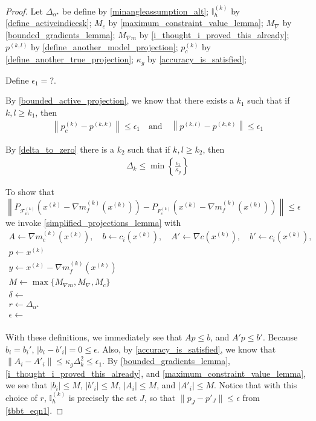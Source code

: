 \documentclass{article}
\theoremstyle{case}
\numberwithin{theorem}{subsection}
\newcommand{\dk}{\Delta_k}
\newcommand{\feasiblek}{{\mathcal F_m^{(k)}}}
\newcommand{\gk}{{\nabla m_f^{(k)}\left(\xk\right)}}
\newcommand{\maxgrad}{{M_{\nabla}}}
\newcommand{\minangledelta}{{\Delta_{\alpha^{\star}}}}
\newcommand{\xk}{x^{(k)}}
\newcommand{\projkl}{{p^{(k,l)}}}
\newcommand{\projkk}{{p^{(k,k)}}}
\newcommand{\trueprojk}{{p_c^{(k)}}}
\newcommand{\truefeasiblek}{{F_c^{(k)}}}
\newcommand{\maxmodelgrad}{{M_{\nabla m}}}
\newcommand{\activeindicesk}{{ \mathbb I_h^{(k)} }}
\newcommand{\modeljack}{{ \nabla m^{(k)}_{c}\left(\xk\right) }}
\newcommand{\truejack}{{ \nabla c\left(\xk\right) }}
\begin{document}
\begin{proof}
Let 
$\minangledelta$ be define by \cref{minangleassumption_alt};
$\activeindicesk$ by \cref{define_activeindicesk};
$M_c$ by \cref{maximum_constraint_value_lemma};
$\maxgrad$ by \cref{bounded_gradients_lemma};
$\maxmodelgrad$ by \cref{i_thought_i_proved_this_already};
$\projkl$ by \cref{define_another_model_projection};
$\trueprojk$ by \cref{define_another_true_projection};
$\kappa_g$ by \cref{accuracy_is_satisfied};

Define $\epsilon_1 = ?$.






By \cref{bounded_active_projection}, we know that there exists a $k_1$ such that if $k, l \ge k_1$, then
\begin{align}
\label{tbbt_eqn1}
\left\| \trueprojk - \projkk \right\| \le \epsilon_1 \quad \textrm{and} \quad
\left\| \projkl - \projkk \right\| \le \epsilon_1
\end{align}


By \cref{delta_to_zero} there is a $k_2$ such that if $k, l \ge k_2$, then
\begin{align*}
\dk \le \min\left\{\frac{\epsilon_1}{\kappa_g} \right\}
\end{align*}



To show that
$\left\| P_{\feasiblek}\left(\xk - \gk\right) - P_{\truefeasiblek}\left(\xk - \gk\right) \right\| \le \epsilon$
we invoke \cref{simplified_projections_lemma} with 
\begin{align*}
A			\gets \modeljack, \quad
b			\gets c_i\left(\xk\right), \quad
A'			\gets \truejack, \quad
b'			\gets c_i\left(\xk\right), \\
p			\gets \xk \\
y			\gets \xk - \gk \\
M			\gets \max\{\maxmodelgrad, \maxgrad, M_c\}\\
\delta		\gets \\
r			\gets \minangledelta \\
\epsilon	\gets \\
\end{align*}

With these definitions, we immediately see that $Ap \le b$, and $A'p \le b'$.
Because $b_i = b_i'$, $|b_i - b'_i| = 0 \le \epsilon$.
Also, by \cref{accuracy_is_satisfied}, we know that $\left\|A_i - A'_i \right\| \le \kappa_g \dk^2 \le \epsilon_1$.
By \cref{bounded_gradients_lemma}, \cref{i_thought_i_proved_this_already}, and \cref{maximum_constraint_value_lemma}, we see that
$\left|b_i\right| \le M $, $\left|b'_i\right| \le M$,
$\left|A_i\right| \le M $, and $\left|A'_i\right| \le M$.
Notice that with this choice of $r$, $\activeindicesk$ is precisely the set $J$,
so that $\|p_J - p'_J\| \le \epsilon$ from \cref{tbbt_eqn1}.


\end{proof}
\end{document}
